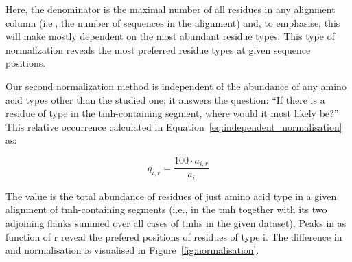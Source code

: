 Here, the denominator is the maximal number of all residues in any alignment column (i.e., the number of sequences in the alignment) and, to emphasise, this will make  mostly dependent on the most abundant residue types.
This type of normalization reveals the most preferred residue types at given sequence positions.

Our second normalization method is independent of the abundance of any amino acid types other than the studied one; it answers the question: ``If there is a residue of type  in the \gls{tmh}-containing segment, where would it most likely be?'' This relative occurrence  calculated in Equation~\ref{eq:independent_normalisation} as:

 \begin{equation} \label{eq:independent_normalisation}
   q_{i,r}=\frac{{100}\cdot{a_{i,r}}}{a_i}
 \end{equation}

The value  is the total abundance of residues of just amino acid type  in a given alignment of \gls{tmh}-containing segments (i.e., in the \gls{tmh} together with its two adjoining flanks summed over all cases of \gls{tmh}s in the given dataset).
Peaks in as function of r reveal the prefered positions of residues of type i.
The difference in   and   normalisation is visualised in Figure~\ref{fig:normalisation}.

